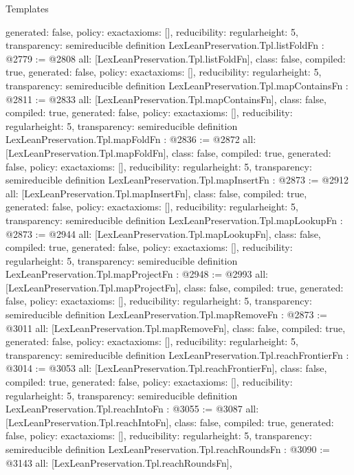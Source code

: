 \begin{lexlean}{Templates}
\begin{coremodule}
{  generated: false,
  policy: exact{axioms: []},
  reducibility: regular{height: 5},
  transparency: semireducible
}
definition LexLeanPreservation.Tpl.listFoldFn : @2779 := @2808 {
  all: [LexLeanPreservation.Tpl.listFoldFn],
  class: false,
  compiled: true,
  generated: false,
  policy: exact{axioms: []},
  reducibility: regular{height: 5},
  transparency: semireducible
}
definition LexLeanPreservation.Tpl.mapContainsFn : @2811 := @2833 {
  all: [LexLeanPreservation.Tpl.mapContainsFn],
  class: false,
  compiled: true,
  generated: false,
  policy: exact{axioms: []},
  reducibility: regular{height: 5},
  transparency: semireducible
}
definition LexLeanPreservation.Tpl.mapFoldFn : @2836 := @2872 {
  all: [LexLeanPreservation.Tpl.mapFoldFn],
  class: false,
  compiled: true,
  generated: false,
  policy: exact{axioms: []},
  reducibility: regular{height: 5},
  transparency: semireducible
}
definition LexLeanPreservation.Tpl.mapInsertFn : @2873 := @2912 {
  all: [LexLeanPreservation.Tpl.mapInsertFn],
  class: false,
  compiled: true,
  generated: false,
  policy: exact{axioms: []},
  reducibility: regular{height: 5},
  transparency: semireducible
}
definition LexLeanPreservation.Tpl.mapLookupFn : @2873 := @2944 {
  all: [LexLeanPreservation.Tpl.mapLookupFn],
  class: false,
  compiled: true,
  generated: false,
  policy: exact{axioms: []},
  reducibility: regular{height: 5},
  transparency: semireducible
}
definition LexLeanPreservation.Tpl.mapProjectFn : @2948 := @2993 {
  all: [LexLeanPreservation.Tpl.mapProjectFn],
  class: false,
  compiled: true,
  generated: false,
  policy: exact{axioms: []},
  reducibility: regular{height: 5},
  transparency: semireducible
}
definition LexLeanPreservation.Tpl.mapRemoveFn : @2873 := @3011 {
  all: [LexLeanPreservation.Tpl.mapRemoveFn],
  class: false,
  compiled: true,
  generated: false,
  policy: exact{axioms: []},
  reducibility: regular{height: 5},
  transparency: semireducible
}
definition LexLeanPreservation.Tpl.reachFrontierFn : @3014 := @3053 {
  all: [LexLeanPreservation.Tpl.reachFrontierFn],
  class: false,
  compiled: true,
  generated: false,
  policy: exact{axioms: []},
  reducibility: regular{height: 5},
  transparency: semireducible
}
definition LexLeanPreservation.Tpl.reachIntoFn : @3055 := @3087 {
  all: [LexLeanPreservation.Tpl.reachIntoFn],
  class: false,
  compiled: true,
  generated: false,
  policy: exact{axioms: []},
  reducibility: regular{height: 5},
  transparency: semireducible
}
definition LexLeanPreservation.Tpl.reachRoundsFn : @3090 := @3143 {
  all: [LexLeanPreservation.Tpl.reachRoundsFn],
}
\end{coremodule}
\end{lexlean}
